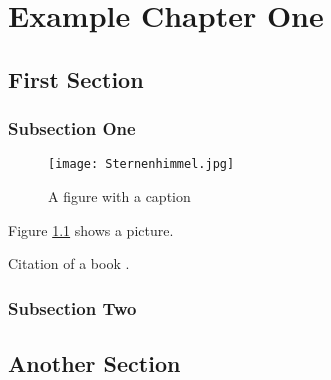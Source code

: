 \chapter{Example Chapter One}

\section{First Section}

\subsection{Subsection One}

\begin{figure}
\centering
\texttt{[image: Sternenhimmel.jpg]}
\caption{A figure with a caption}
\label{fig:Sternenhimmel}
\end{figure}

Figure \ref{fig:Sternenhimmel} shows a picture.

Citation of a book \cite{hartley2004}.

\lipsum[1-2]

\subsection{Subsection Two}

\lipsum[4-5]

\section{Another Section}

\lipsum[6-9]